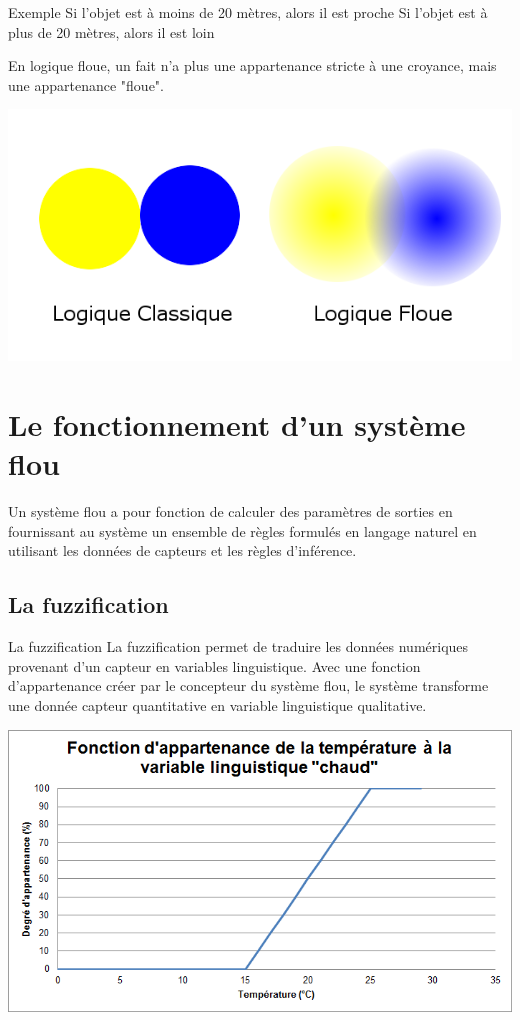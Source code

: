 \documentclass[aspectratio=169,professionalfonts, 12pt]{beamer}
\begin{document}
\begin{frame}
   \begin{block}{Exemple}
    Si l'objet est à moins de 20 mètres, alors il est proche \newline
    Si l'objet est à plus de 20 mètres, alors il est loin
   \end{block}
   En logique floue, un fait n'a plus une appartenance
   stricte à une croyance, mais une appartenance "floue".
   \begin{center}
     \includegraphics[height=0.4\textwidth]{images/logique_floue.png}
   \end{center}
\end{frame}

\section{Le fonctionnement d’un système flou}

\begin{frame}
  Un système flou a pour fonction de calculer des paramètres de sorties en
  fournissant au système un ensemble de règles formulés en langage naturel
  en utilisant les données de capteurs et les règles d’inférence.
\end{frame}

\subsection{La fuzzification}

\begin{frame}{La fuzzification}
  La fuzzification permet de traduire les données numériques provenant
  d’un capteur en variables linguistique. Avec une fonction d’appartenance
  créer par le concepteur du système flou, le système transforme une donnée
  capteur quantitative en variable linguistique qualitative.
\end{frame}
\begin{frame}
  \includegraphics[height=0.5\textwidth]{images/chaud.png}
\end{frame}
\end{document}
